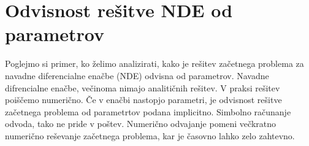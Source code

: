 \documentclass[12pt,slovene]{article}
\begin{document}
\section{Odvisnost rešitve NDE od parametrov}

Poglejmo si primer, ko želimo analizirati, kako je rešitev začetnega problema za navadne diferencialne enačbe (NDE) odvisna od parametrov. Navadne difrencialne enačbe, večinoma nimajo analitičnih rešitev. V praksi rešitev poiščemo numerično.
Če v enačbi nastopjo parametri, je odvisnost rešitve začetnega problema od parametrtov podana implicitno. Simbolno računanje odvoda, tako ne pride v poštev.
Numerično odvajanje pomeni večkratno numerično reševanje začetnega problema, kar je časovno lahko zelo zahtevno.  

\begin{thebibliography}{1}

\bibitem{}

\end{thebibliography}
\end{document}
